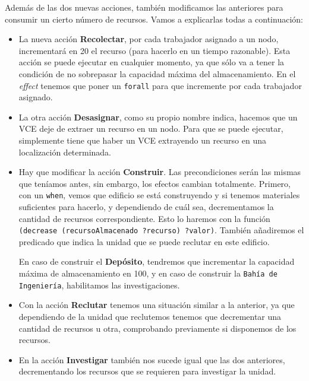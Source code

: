 \documentclass[11pt,a4paper]{article}
\begin{document}
Además de las dos nuevas acciones, también modificamos las anteriores para consumir un cierto número de recursos. Vamos a
explicarlas todas a continuación:
\begin{itemize}
    \item La nueva acción \textbf{Recolectar}, por cada trabajador asignado a un nodo, incrementará en 20 el recurso (para
          hacerlo en un tiempo razonable). Esta acción se puede ejecutar en cualquier momento, ya que sólo va a tener la condición
          de no sobrepasar la capacidad máxima del almacenamiento. En el \textit{effect} tenemos que poner un \texttt{forall} para
          que incremente por cada trabajador asignado.

    \item La otra acción \textbf{Desasignar}, como su propio nombre indica, hacemos que un VCE deje de extraer un recurso en un
          nodo. Para que se puede ejecutar, simplemente tiene que haber un VCE extrayendo un recurso en una localización
          determinada.

    \item Hay que modificar la acción \textbf{Construir}. Las precondiciones serán las mismas que teníamos antes, sin embargo,
          los efectos cambian totalmente. Primero, con un \texttt{when}, vemos que edificio se está construyendo y si tenemos
          materiales suficientes para hacerlo, y dependiendo de cuál sea, decrementamos la cantidad de recursos correspondiente.
          Esto lo haremos con la función \texttt{(decrease (recursoAlmacenado ?recurso) ?valor)}. También añadiremos el predicado
          que indica la unidad que se puede reclutar en este edificio.

          En caso de construir el \textbf{Depósito}, tendremos que incrementar la capacidad máxima de almacenamiento en 100, y
          en caso de construir la \texttt{Bahía de Ingeniería}, habilitamos las investigaciones.

    \item Con la acción \textbf{Reclutar} tenemos una situación similar a la anterior, ya que dependiendo de la unidad que
          reclutemos tenemos que decrementar una cantidad de recursos u otra, comprobando previamente si disponemos de los
          recursos.

    \item En la acción \textbf{Investigar} también nos sucede igual que las dos anteriores, decrementando los recursos que se
          requieren para investigar la unidad.
\end{itemize}
\end{document}
